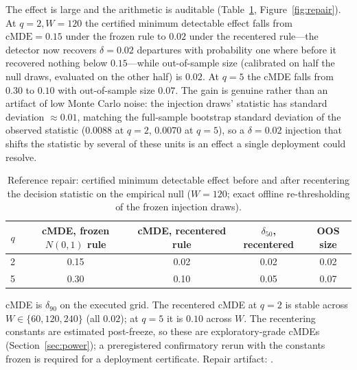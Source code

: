 \documentclass[3p]{elsarticle}
\begin{document}
The effect is large and the arithmetic is auditable
(Table~\ref{tab:repair}, Figure~\ref{fig:repair}). At $q{=}2, W{=}120$ the
certified minimum detectable effect falls from $\mathrm{cMDE}=0.15$ under the
frozen rule to $0.02$ under the recentered rule---the detector now recovers
$\delta=0.02$ departures with probability one where before it recovered
nothing below $0.15$---while out-of-sample size (calibrated on half the null
draws, evaluated on the other half) is $0.02$. At $q{=}5$ the cMDE falls from
$0.30$ to $0.10$ with out-of-sample size $0.07$. The gain is genuine rather
than an artifact of low Monte Carlo noise: the injection draws' statistic has
standard deviation $\approx0.01$, matching the full-sample bootstrap standard
deviation of the observed statistic ($0.0088$ at $q{=}2$, $0.0070$ at
$q{=}5$), so a $\delta=0.02$ injection that shifts the statistic by several
of these units is an effect a single deployment could resolve.

\begin{table}[htbp]
\centering
\begin{threeparttable}
\caption{Reference repair: certified minimum detectable effect before and
after recentering the decision statistic on the empirical null ($W{=}120$;
exact offline re-thresholding of the frozen injection draws).}
\label{tab:repair}
\small
\begin{tabular}{c c c c c}
\toprule
$q$ & cMDE, frozen $N(0,1)$ rule & cMDE, recentered rule & $\delta_{50}$, recentered & OOS size \\
\midrule
2 & 0.15 & 0.02 & 0.02 & 0.02 \\
5 & 0.30 & 0.10 & 0.05 & 0.07 \\
\bottomrule
\end{tabular}
\begin{tablenotes}\footnotesize
\item cMDE is $\delta_{90}$ on the executed grid. The recentered cMDE at
$q{=}2$ is stable across $W\in\{60,120,240\}$ (all $0.02$); at $q{=}5$ it is
$0.10$ across $W$. The recentering constants are estimated post-freeze, so
these are exploratory-grade cMDEs (Section~\ref{sec:power}); a preregistered
confirmatory rerun with the constants frozen is required for a deployment
certificate. Repair artifact:
.
\end{tablenotes}
\end{threeparttable}
\end{table}
\end{document}
